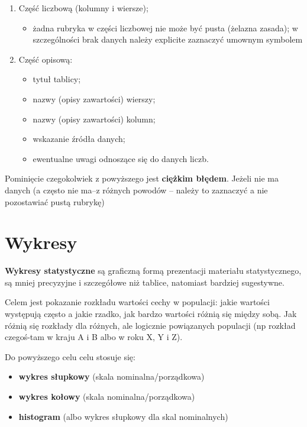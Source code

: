 \documentclass[
  openany]{book}
\providecommand{\tightlist}{%
  \setlength{\itemsep}{0pt}\setlength{\parskip}{0pt}}
\begin{document}
\begin{enumerate}
\def\labelenumi{\arabic{enumi}.}
\item
  Część liczbową (kolumny i wiersze);

  \begin{itemize}
  \tightlist
  \item
    żadna rubryka w części liczbowej nie może być pusta (żelazna zasada); w szczególności brak danych należy
    explicite zaznaczyć umownym symbolem
  \end{itemize}
\item
  Część opisową:

  \begin{itemize}
  \tightlist
  \item
    tytuł tablicy;
  \item
    nazwy (opisy zawartości) wierszy;
  \item
    nazwy (opisy zawartości) kolumn;
  \item
    wskazanie źródła danych;
  \item
    ewentualne uwagi odnoszące się do danych liczb.
  \end{itemize}
\end{enumerate}

Pominięcie czegokolwiek z powyższego jest \textbf{ciężkim błędem}. Jeżeli
nie ma danych (a często nie ma--z różnych powodów -- należy to zaznaczyć a nie
pozostawiać pustą rubrykę)

\hypertarget{wykresy}{%
\section{Wykresy}\label{wykresy}}

\textbf{Wykresy statystyczne} są graficzną formą prezentacji materiału
statystycznego, są mniej precyzyjne i szczegółowe niż tablice,
natomiast bardziej sugestywne.

Celem jest pokazanie rozkładu wartości cechy w populacji: jakie wartości występują
często a jakie rzadko, jak bardzo wartości różnią się między sobą. Jak różnią
się rozkłady dla różnych, ale logicznie powiązanych populacji
(np rozkład czegoś-tam w kraju A i B albo w roku X, Y i Z).

Do powyższego celu celu stosuje się:

\begin{itemize}
\item
  \textbf{wykres słupkowy} (skala nominalna/porządkowa)
\item
  \textbf{wykres kołowy} (skala nominalna/porządkowa)
\item
  \textbf{histogram} (albo wykres słupkowy dla skal nominalnych)
\end{itemize}
\end{document}
